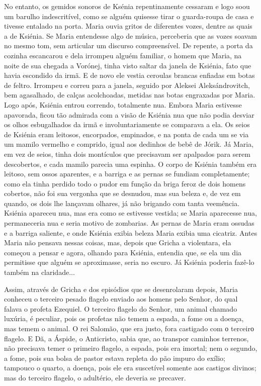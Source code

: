 No entanto, os gemidos sonoros de Ksénia repentinamente cessaram e logo
soou um barulho indescritível, como se alguém quisesse tirar o
guarda-roupa de casa e tivesse entalado na porta. Maria ouvia gritos de
diferentes vozes, dentre as quais a de Ksiénia. Se Maria entendesse algo
de música, perceberia que as vozes soavam no mesmo tom, sem articular um
discurso compreensível. De repente, a porta da cozinha escancarou e dela
irrompeu alguém familiar, o homem que Maria, na noite de sua chegada a
Vorónej, tinha visto saltar da janela de Ksiénia, fato que havia
escondido da irmã. E de novo ele vestia ceroulas brancas enfiadas em
botas de feltro. Irrompeu e correu para a janela, seguido por Aleksei
Aleksándrovitch, bem agasalhado, de calças acolchoadas, metidas nas
botas engraxadas por Maria. Logo após, Ksiénia entrou correndo,
totalmente nua. Embora Maria estivesse apavorada, ficou tão admirada com
a visão de Ksiénia nua que não podia desviar os olhos esbugalhados da
irmã e involuntariamente se comparava a ela. Os seios de Ksiénia eram
leitosos, encorpados, empinados, e na ponta de cada um se via um mamilo
vermelho e comprido, igual aos dedinhos de bebê de Jórik. Já Maria, em
vez de seios, tinha dois montículos que precisavam ser apalpados para
serem descobertos, e cada mamilo parecia uma espinha. O corpo de Ksiénia
também era leitoso, sem ossos aparentes, e a barriga e as pernas se
fundiam completamente; como ela tinha perdido todo o pudor em função da
briga feroz de dois homens cobertos, não foi sua vergonha que se
desnudou, mas sua beleza e, de vez em quando, os dois lhe lançavam
olhares, já não brigando com tanta veemência. Ksiénia apareceu nua, mas
era como se estivesse vestida; se Maria aparecesse nua, permaneceria nua
e seria motivo de zombarias. As pernas de Maria eram ossudas e a barriga
saliente, e onde Ksiénia exibia beleza Maria exibia uma cicatriz. Antes
Maria não pensava nessas coisas, mas, depois que Gricha a violentara,
ela começou a pensar e agora, olhando para Ksiénia, entendia que, se ela
um dia permitisse que alguém se aproximasse, seria no escuro. Já Ksiénia
poderia fazê-lo também na claridade...

Assim, através de Gricha e dos episódios que se desenrolaram depois,
Maria conheceu o terceiro pesado flagelo enviado aos homens pelo Senhor,
do qual falava o profeta Ezequiel. O terceiro flagelo do Senhor, um
animal chamado luxúria, é peculiar, pois os profetas não temem a espada,
a fome ou a doença, mas temem o animal. O rei Salomão, que era justo,
fora castigado com о terceirо flagelo. E Dã, a Áspide, o Anticristo,
sabia que, ao transpor caminhos terrenos, não precisava temer o primeiro
flagelo, a espada, pois era imortal; nem o segundo, a fome, pois sua
bolsa de pastor estava repleta do pão impuro do exílio; tampouco o
quarto, a doença, pois ele era suscetível somente aos castigos divinos;
mas do terceiro flagelo, o adultério, ele deveria se precaver.

